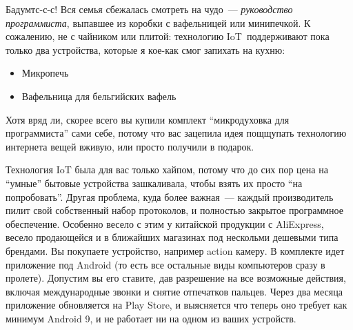 \clearpage
{}\label{intro}

\noindent
Бадумтс-с-с! Вся семья сбежалась смотреть на чудо\ --- \textit{руководство
программиста}, выпавшее из коробки с вафельницей или минипечкой. К сожалению, не с
чайником или плитой: технологию IoT\
поддерживают пока только два устройства, которые я кое-как смог запихать на
кухню:
\begin{itemize}
  \item 
Микропечь
  \item 
Вафельница для бельгийских вафель
\end{itemize}

\noindent
Хотя вряд ли, скорее всего вы купили комплект ``микродуховка для программиста''
сами себе, потому что вас зацепила идея пощщупать технологию интернета вещей
вживую, или просто получили в подарок.

\clearpage
{}

Технология IoT была для вас только хайпом, потому что до сих пор
цена на ``умные'' бытовые устройства зашкаливала, чтобы взять их просто ``на
попробовать''. Другая проблема, куда более важная\ --- каждый производитель
пилит свой собственный набор протоколов, и полностью закрытое программное
обеспечение. Особенно весело с этим у китайской продукции с AliExpress, весело
продающейся и в ближайших магазинах под нескольми дешевыми типа брендами.
Вы покупаете устройство, например action камеру. В комплекте идет приложение под
Android (то есть все остальные виды компьютеров сразу в пролете). Допустим вы
его ставите, дав разрешение на все возможные действия, включая международные
звонки и снятие отпечатков пальцев. Через два месяца приложение обновляется на
Play Store, и выясняется что теперь оно требует как минимум Android 9, и не
работает ни на одном из ваших устройств.
